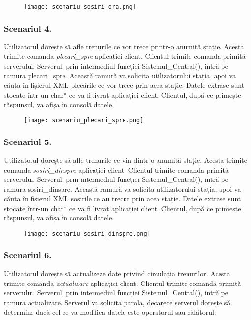 \documentclass[runningheads]{llncs}
\begin{document}
\begin{figure} [H]
    \centering
    \texttt{[image: scenariu\_sosiri\_ora.png]}
\end{figure}

 \subsubsection{Scenariul 4.}
   Utilizatorul dorește să afle trenurile ce vor trece printr-o anumită stație.  Acesta trimite comanda \textit{plecari\_spre} aplicației client. Clientul trimite comanda primită serverului. Serverul, prin intermediul funcției Sistemul\_Central(), intră pe ramura plecari\_spre.  Această ramură va solicita utilizatorului stația, apoi va căuta în fișierul XML plecările ce vor trece prin acea stație. Datele extrase sunt stocate într-un char* ce va fi livrat aplicației client. Clientul, după ce primește răspunsul, va afișa în consolă datele.

\begin{figure} [H]
    \centering
    \texttt{[image: scenariu\_plecari\_spre.png]}
\end{figure}

 \subsubsection{Scenariul 5.}
    Utilizatorul dorește să afle trenurile ce vin dintr-o anumită stație. Acesta trimite comanda \textit{sosiri\_dinspre} aplicației client. Clientul trimite comanda primită serverului. Serverul, prin intermediul funcției Sistemul\_Central(), intră pe ramura sosiri\_dinspre.  Această ramură va solicita utilizatorului stația, apoi va căuta în fișierul XML sosirile ce au trecut prin acea stație. Datele extrase sunt stocate într-un char* ce va fi livrat aplicației client. Clientul, după ce primește răspunsul, va afișa în consolă datele.

\begin{figure} [H]
    \centering
    \texttt{[image: scenariu\_sosiri\_dinspre.png]}
\end{figure}

 \subsubsection{Scenariul 6.}
 Utilizatorul dorește să actualizeze date privind circulația trenurilor. Acesta trimite comanda \textit{actualizare} aplicației client. Clientul trimite comanda primită serverului. Serverul, prin intermediul funcției Sistemul\_Central(), intră pe ramura actualizare. Serverul va solicita parola, deoarece serverul dorește să determine dacă cel ce va modifica datele este operatorul sau călătorul. 
\end{document}
